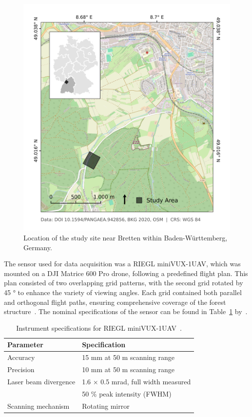 \documentclass{isprs} %
\begin{document}
\begin{figure}[ht!]
\begin{center}
		\includegraphics[width=1.0\columnwidth]{figures/study_area_map.png}
	\caption{Location of the study site near Bretten within Baden-Württemberg, Germany.}
\label{fig: study area}
\end{center}
\end{figure}

The sensor used for data acquisition was a RIEGL miniVUX-1UAV, which was mounted on a DJI Matrice 600 Pro drone, following a predefined flight plan. This plan consisted of two overlapping grid patterns, with the second grid rotated by 45 ° to enhance the variety of viewing angles. Each grid contained both parallel and orthogonal flight paths, ensuring comprehensive coverage of the forest structure~\cite{Weiser2022b}. The nominal specifications of the sensor can be found in Table~\ref{tab:instrument_specifications} by~\cite{Weiser2022b}.

\begin{table}[ht!]
    \centering
    \small
    \begin{tabular}{|l|l|}
        \hline
        \textbf{Parameter} & \textbf{Specification} \\
        \hline
        Accuracy & 15 mm at 50 m scanning range \\
        Precision & 10 mm at 50 m scanning range \\
        Laser beam divergence & 1.6 × 0.5 mrad, full width measured \\ & 50 \% peak intensity (FWHM) \\
        Scanning mechanism & Rotating mirror \\
        \hline
    \end{tabular}
    \caption{Instrument specifications for RIEGL miniVUX-1UAV~\protect\cite{Weiser2022b}.}
\label{tab:instrument_specifications}
\end{table}
\end{document}
